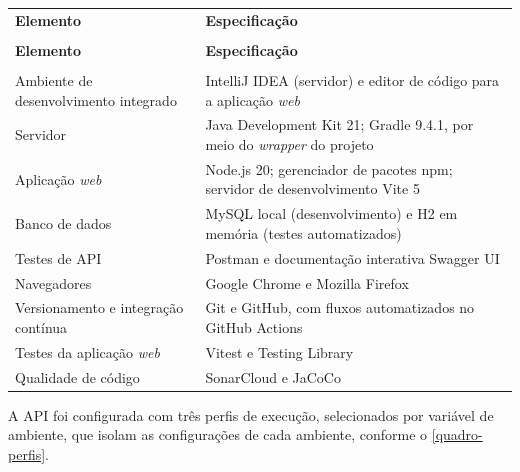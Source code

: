 {\ABNTEXfontereduzida
\renewcommand{\arraystretch}{1.25}
\begin{xltabular}{\textwidth}{|>{\raggedright\arraybackslash}p{4.4cm}|>{\raggedright\arraybackslash}X|}
 \\[0.3em]
\hline
\textbf{Elemento} & \textbf{Especificação} \\
\hline
\endfirsthead
{} \\
\hline
\textbf{Elemento} & \textbf{Especificação} \\
\hline
\endhead
{} \\
\endfoot
\endlastfoot
Ambiente de desenvolvimento integrado & IntelliJ IDEA (servidor) e editor de código para a aplicação \textit{web} \\
\hline
Servidor & Java Development Kit 21; Gradle 9.4.1, por meio do \textit{wrapper} do projeto \\
\hline
Aplicação \textit{web} & Node.js 20; gerenciador de pacotes npm; servidor de desenvolvimento Vite 5 \\
\hline
Banco de dados & MySQL local (desenvolvimento) e H2 em memória (testes automatizados) \\
\hline
Testes de API & Postman e documentação interativa Swagger UI \\
\hline
Navegadores & Google Chrome e Mozilla Firefox \\
\hline
Versionamento e integração contínua & Git e GitHub, com fluxos automatizados no GitHub Actions \\
\hline
Testes da aplicação \textit{web} & Vitest e Testing Library \\
\hline
Qualidade de código & SonarCloud e JaCoCo \\
\hline
\end{xltabular}
}

A API foi configurada com três perfis de execução, selecionados por variável de ambiente, que isolam as configurações de cada ambiente, conforme o \autoref{quadro-perfis}.

